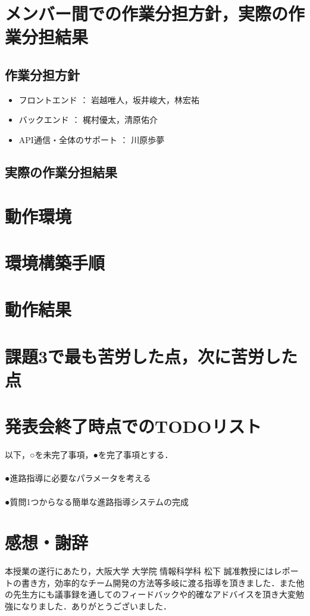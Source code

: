 \documentclass[a4j,titlepage]{jarticle}
\begin{document}
\section{メンバー間での作業分担方針，実際の作業分担結果}

\subsection{作業分担方針}
\begin{itemize}
\item フロントエンド ： 岩越唯人，坂井峻大，林宏祐
\item バックエンド ： 梶村優太，清原佑介
\item API通信・全体のサポート ： 川原歩夢
\end{itemize}

\subsection{実際の作業分担結果}


\section{動作環境}

\section{環境構築手順}

\section{動作結果}

\section{課題3で最も苦労した点，次に苦労した点}

\section{発表会終了時点でのTODOリスト}
以下，○を未完了事項，●を完了事項とする．\\
\\
●進路指導に必要なパラメータを考える\\
\\
●質問1つからなる簡単な進路指導システムの完成\\
\section{感想・謝辞}
本授業の遂行にあたり，大阪大学 大学院 情報科学科 松下 誠准教授にはレポートの書き方，効率的なチーム開発の方法等多岐に渡る指導を頂きました．また他の先生方にも議事録を通してのフィードバックや的確なアドバイスを頂き大変勉強になりました．ありがとうございました．
\end{document}

